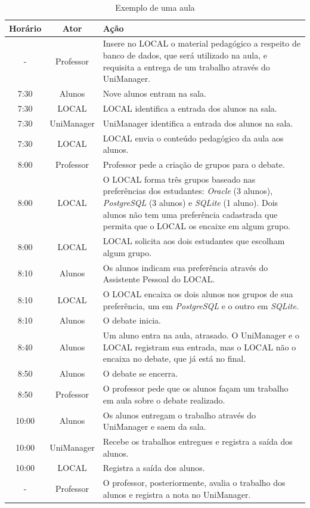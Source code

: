 \begin{table}\centering\footnotesize
    \begin{tabular*}{1\textwidth}{@{}ccp{12cm}@{}}
    \toprule
    Horário & Ator & Ação \\
    \midrule
    - & Professor & Insere no LOCAL o material pedagógico a respeito de banco de dados, que será utilizado na aula, e requisita a entrega de um trabalho através do UniManager. \\
    7:30 & Alunos & Nove alunos entram na sala. \\
    7:30 & LOCAL & LOCAL identifica a entrada dos alunos na sala. \\
    7:30 & UniManager & UniManager identifica a entrada dos alunos na sala. \\
    7:30 & LOCAL & LOCAL envia o conteúdo pedagógico da aula aos alunos. \\
    8:00 & Professor & Professor pede a criação de grupos para o debate. \\
    8:00 & LOCAL & O LOCAL forma três grupos baseado nas preferências dos estudantes: {\em Oracle} (3 alunos), {\em PostgreSQL} (3 alunos) e {\em SQLite} (1 aluno). Dois alunos não tem uma preferência cadastrada que permita que o LOCAL os encaixe em algum grupo. \\
    8:00 & LOCAL & LOCAL solicita aos dois estudantes que escolham algum grupo. \\
    8:10 & Alunos & Os alunos indicam sua preferência através do Assistente Pessoal do LOCAL. \\
    8:10 & LOCAL & O LOCAL encaixa os dois alunos nos grupos de sua preferência, um em {\em PostgreSQL} e o outro em {\em SQLite}. \\
    8:10 & Alunos & O debate inicia. \\
    8:40 & Alunos & Um aluno entra na aula, atrasado. O UniManager e o LOCAL registram sua entrada, mas o LOCAL não o encaixa no debate, que já está no final. \\
    8:50 & Alunos & O debate se encerra. \\
    8:50 & Professor & O professor pede que os alunos façam um trabalho em aula sobre o debate realizado. \\
    10:00 & Alunos & Os alunos entregam o trabalho através do UniManager e saem da sala. \\
    10:00 & UniManager & Recebe os trabalhos entregues e registra a saída dos alunos. \\
    10:00 & LOCAL & Registra a saída dos alunos. \\
        - & Professor & O professor, posteriormente, avalia o trabalho dos alunos e registra a nota no UniManager. \\
    \bottomrule
  \end{tabular*}
  \caption{Exemplo de uma aula}
  \label{tab:aula}
\end{table}


